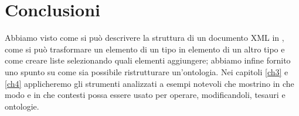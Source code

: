 \section{Conclusioni}
Abbiamo visto come si può descrivere la struttura di un documento XML in \cduce, come si può trasformare un elemento di un tipo in elemento di un altro tipo e come creare liste selezionando quali elementi aggiungere; abbiamo infine fornito uno spunto su come sia possibile ristrutturare un'ontologia. Nei capitoli \ref{ch3} e \ref{ch4} applicheremo gli strumenti analizzati a esempi notevoli che mostrino in che modo e in che contesti \cduce possa essere usato per operare, modificandoli, tesauri e ontologie.